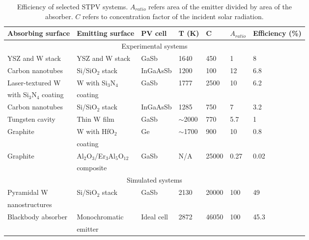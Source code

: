\documentclass[review]{elsarticle}
\begin{document}
{\small
\begin{table}
        \begin{center}
	\caption{Efficiency of selected STPV systems.  $A_{ratio}$ refers area of the emitter divided by area of the absorber.  $C$ refers to concentration factor of the incident solar radiation.}
	\label{STPV_sys_table}
		\begin{tabular}{|lllllll|}
		\hline
		Absorbing surface & Emitting surface & PV cell & T (K) & C & $A_{ratio}$ & Efficiency (\%)\\
		\hline
		\multicolumn{7}{c}{Experimental systems} \\
		\hline
		YSZ and W stack	& YSZ and W stack	& GaSb & 1640 & 450 & 1 &	8 \cite{SKY_JPE_2015} \\%
		Carbon nanotubes	& Si/SiO$_2$ stack	& InGaAsSb & 1200 & 100 & 12 &	6.8 \cite{nnnNature}\\%
		Laser-textured W & W with Si$_3$N$_4$ & GaSb & 1777 & 2500 & 10 & 6.2 \cite{me3}\\%
		with Si$_3$N$_4$ coating & coating &&&&&\\
		Carbon nanotubes & Si/SiO$_2$ stack & InGaAsSb & 1285 & 750 & 7 & 3.2 \cite{MIT_paper} \\%
		Tungsten cavity & Thin W film & GaSb & $\sim$2000 & 770 & 5.7 & 1 \cite{exp_russia}\\%
		Graphite & W with HfO$_2$ & Ge & $\sim$1700 & 900 & 10 & 0.8 \cite{exp_madrid}\\%
		& coating &&&&&\\
		Graphite & {A}l$_2${O}$_3$/{E}r$_3${A}l$_5${O}$_{12}$ & GaSb & N/A & 25000 & 0.27 & 0.02 \cite{exp_tokyo} \\%
		& composite &&&&&\\
		\hline
		\multicolumn{7}{c}{Simulated systems} \\
		\hline
		Pyramidal W & Si/SiO$_2$ stack & GaSb & 2130 & 20000 & 100 & 49~\cite{RF_OptExp_2009}\\
		nanostructures &&&&&&\\
		Blackbody absorber	& Monochromatic & Ideal cell	& 2872 & 46050 & 100 & 45.3~\cite{global_opt}\\
		& emitter &&&&&\\

\end{tabular}
\end{center}
\end{table}}
\end{document}
